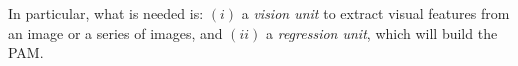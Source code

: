 In particular, what is needed is: $(i)$ a \emph{vision unit} to extract visual features from an image or a series of images, and $(ii)$ a \emph{regression unit}, which will build the PAM.

